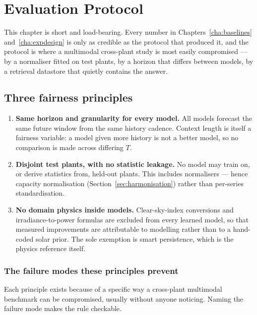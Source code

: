 \chapter{Evaluation Protocol}
\label{cha:protocol}

This chapter is short and load-bearing. Every number in Chapters~\ref{cha:baselines}
and~\ref{cha:expdesign} is only as credible as the protocol that produced it, and the
protocol is where a multimodal cross-plant study is most easily compromised --- by a
normaliser fitted on test plants, by a horizon that differs between models, by a retrieval
datastore that quietly contains the answer.

\section{Three fairness principles}
\label{sec:fairness}

\begin{enumerate}
  \item \textbf{Same horizon and granularity for every model.} All models forecast the same
    future window from the same history cadence. Context length is itself a fairness
    variable: a model given more history is not a better model, so no comparison is made
    across differing $T$.
  \item \textbf{Disjoint test plants, with no statistic leakage.} No model may train on, or
    derive statistics from, held-out plants. This includes normalisers --- hence
    capacity normalisation (Section~\ref{sec:harmonisation}) rather than per-series
    standardisation.
  \item \textbf{No domain physics inside models.} Clear-sky-index conversions and
    irradiance-to-power formulas are excluded from every learned model, so that measured
    improvements are attributable to modelling rather than to a hand-coded solar prior. The
    sole exemption is smart persistence, which is the physics reference itself.
\end{enumerate}

\subsection{The failure modes these principles prevent}

Each principle exists because of a specific way a cross-plant multimodal benchmark can be
compromised, usually without anyone noticing. Naming the failure mode makes the rule
checkable.

